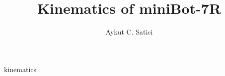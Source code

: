\documentclass[journal,twoside,web]{ieeecolor}
\begin{document}
\title{Kinematics of miniBot-7R} 
\author{
Aykut C. Satici  %
}
\maketitle


\begin{IEEEkeywords}
    kinematics
\end{IEEEkeywords}






        
  



%         
%   
\end{document}
